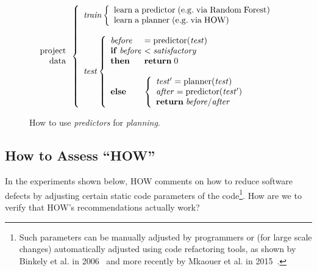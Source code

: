 \documentclass[conference]{IEEEtran}
\begin{document}
\begin{figure}[!t]
\small 
\[
\begin{array}{r}
\mathrm{project}\\
\mathrm{data}
\end{array} 
\left\{\begin{array}{l}\mathit{train}
        \left\{\begin{array}{l}
                \mathrm{learn\;a\;}\mathrm{predictor\;}\mathrm{(e.g.\;via \;Random\;Forest)}\\
                \mathrm{learn\;a\;}\mathrm{planner\;}\mathrm{(e.g.\;via \; HOW)}
              \end{array}\right.
       \\
      ~\\
\mathit{test}  
    \left\{\begin{array}{l@{~}l}
           \mathit{before}& =\mathrm{predictor}(\mathit{test})\\
           \mathrm{\bf if\;}\mathit{before} & <  \mathit{satisfactory}\\
           \mathrm{\bf then}  & \mathrm{{\bf return}\; 0}\\~\\
           \mathrm{\bf else} &
           \left\{
            \begin{array}{l}
                \mathit{test'} = \mathrm{planner}(\mathit{test})\\
                \mathit{after} =\mathrm{predictor}(\mathit{test'})\\ 
                \mathrm{{\bf return}\;} \mathit{before} /  \mathit{after}
            \end{array}
          \right.
   \end{array}\right.
\end{array} \right. 
\]
 
\caption{How to use {\em predictors} for {\em planning}.}\label{fig:work}
\end{figure}



\subsection{How to Assess ``HOW''}
In the experiments shown below,  HOW comments  on how to reduce
software defects by adjusting certain static code parameters of the code\footnote{Such parameters can be manually adjusted by programmers or (for large scale changes) automatically adjusted using code refactoring
tools, as shown by Binkely et al. in 2006~\cite{Binkley2006} and more recently by Mkaouer et al. in 2015~\cite{Mkaouer15}.}. How are we to verify that HOW's recommendations actually work? 
\end{document}
